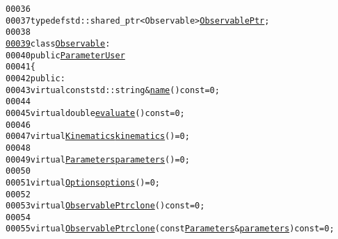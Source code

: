 \begin{footnotesize}
\begin{alltt}
00036 
00037     \textcolor{keyword}{typedef} std::shared\_ptr<Observable> \hyperlink{namespaceeos_a470e5dd806bd129080f1aa0c2954646f}{ObservablePtr};
00038 
\hypertarget{observable_8hh_source_l00039}{}\hyperlink{classeos_1_1Observable}{00039}     \textcolor{keyword}{class }\hyperlink{classeos_1_1Observable}{Observable} :
00040         \textcolor{keyword}{public} \hyperlink{classeos_1_1ParameterUser}{ParameterUser}
00041     \{
00042         \textcolor{keyword}{public}:
00043             \textcolor{keyword}{virtual} \textcolor{keyword}{const} std::string & \hyperlink{classeos_1_1Observable_adfdc8fe469e00adeb464d3b3e4e14236}{name}() \textcolor{keyword}{const} = 0;
00044 
00045             \textcolor{keyword}{virtual} \textcolor{keywordtype}{double} \hyperlink{classeos_1_1Observable_a913385d3a077d578bbcc2d502e5fdc2d}{evaluate}() \textcolor{keyword}{const} = 0;
00046 
00047             \textcolor{keyword}{virtual} \hyperlink{classeos_1_1Kinematics}{Kinematics} \hyperlink{classeos_1_1Observable_a8bfd8cc2873e467ac9ae100d029d8c49}{kinematics}() = 0;
00048 
00049             \textcolor{keyword}{virtual} \hyperlink{classeos_1_1Parameters}{Parameters} \hyperlink{classeos_1_1Observable_a233852d22f287944b8bbf4da803289b1}{parameters}() = 0;
00050 
00051             \textcolor{keyword}{virtual} \hyperlink{classeos_1_1Options}{Options} \hyperlink{classeos_1_1Observable_a237cf968a4f46a93e0cc8ba0fdbaceee}{options}() = 0;
00052 
00053             \textcolor{keyword}{virtual} \hyperlink{namespaceeos_a470e5dd806bd129080f1aa0c2954646f}{ObservablePtr} \hyperlink{classeos_1_1Observable_a1c88c66a224a14fbddad70e95cb61136}{clone}() \textcolor{keyword}{const} = 0;
00054 
00055             \textcolor{keyword}{virtual} \hyperlink{namespaceeos_a470e5dd806bd129080f1aa0c2954646f}{ObservablePtr} \hyperlink{classeos_1_1Observable_a1c88c66a224a14fbddad70e95cb61136}{clone}(\textcolor{keyword}{const} \hyperlink{classeos_1_1Parameters}{Parameters} & \hyperlink{classeos_1_1Observable_a233852d22f287944b8bbf4da803289b1}{parameters}) \textcolor{keyword}{const} = 0;
      

\end{alltt}
\end{footnotesize}
